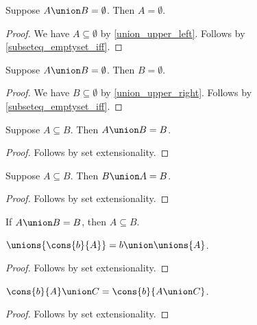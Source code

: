 \begin{proposition}%
\label{union_emptyset_elim_left}
    Suppose $A\union B = \emptyset$. Then $A = \emptyset$.
\end{proposition}
\begin{proof}
    We have $A\subseteq\emptyset$ by \cref{union_upper_left}.
    Follows by \cref{subseteq_emptyset_iff}.
\end{proof}

\begin{proposition}%
\label{union_emptyset_elim_right}
    Suppose $A\union B = \emptyset$. Then $B = \emptyset$.
\end{proposition}
\begin{proof}
    We have $B\subseteq\emptyset$ by \cref{union_upper_right}.
    Follows by \cref{subseteq_emptyset_iff}.
\end{proof}

\begin{proposition}%
\label{union_absorb_subseteq_left}
    Suppose $A\subseteq B$. Then $A\union B = B$.
\end{proposition}
\begin{proof}
    Follows by set extensionality.
\end{proof}

\begin{proposition}%
\label{union_absorb_subseteq_right}
    Suppose $A\subseteq B$. Then $B\union A = B$.
\end{proposition}
\begin{proof}
    Follows by set extensionality.
\end{proof}

\begin{proposition}%
\label{union_eq_self_implies_subseteq}
    If $A\union B = B$, then $A\subseteq B$.
\end{proposition}

\begin{proposition}\label{unions_cons}
    $\unions{\cons{b}{A}} = b\union\unions{A}$.
\end{proposition}
\begin{proof}
    Follows by set extensionality.
\end{proof}

\begin{proposition}\label{union_cons}
    $\cons{b}{A} \union C = \cons{b}{A\union C}$.
\end{proposition}
\begin{proof}
    Follows by set extensionality.
\end{proof}

